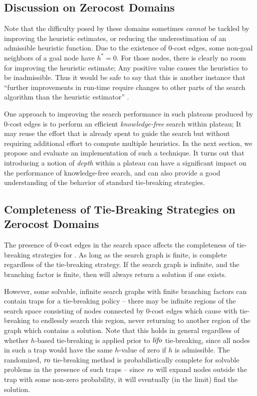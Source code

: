 \subsection{Discussion on Zerocost Domains}

Note that the difficulty posed by these domains sometimes \emph{cannot}
be tackled by improving the heuristic estimates, or reducing the
underestimation of an admissible heuristic function.  Due to the
existence of 0-cost edges, some non-goal neighbors of a goal node 
have $h^*=0$. For those nodes,
there is clearly no room for improving the heuristic estimate; Any positive
value causes the heuristics to be inadmissible.
Thus it would be safe to say that this is another instance that
``further improvements in run-time require
changes to other parts of the search algorithm than the heuristic estimator''
 \cite{helmert2008good}.

One approach to improving the search performance in such plateaus
produced by 0-cost edges is to perform an efficient
\emph{knowledge-free} search within plateau; It may reuse the effort
that is already spent to guide the search but without requiring 
additional effort to compute multiple heuristics.
In the next section, we propose and evaluate an implementation of
such a technique. It turns out that introducing a notion of \emph{depth} within a plateau can have
a significant impact on the performance of knowledge-free search, and can also 
provide a good  understanding of the behavior of standard tie-breaking strategies.

\subsection{Completeness of Tie-Breaking Strategies on Zerocost Domains}

The presence of 0-cost edges in the search space affects the completeness of tie-breaking strategies for \astar. 
As long as the search graph is finite, \astar is complete regardless of the tie-breaking strategy.
If the search graph is infinite, and the branching factor is finite, then 
\fifo will always return a solution if one exists.

However, some solvable, infinite search graphs with finite branching factors can contain traps for a \lifo tie-breaking policy -- there may be infinite regions of the search space consisting of nodes connected by 0-cost edges which cause \astar with \lifo tie-breaking to endlessly search this region, never returning to another region of the graph which contains a solution.
Note that this holds in general regardless of whether $h$-based tie-breaking is applied prior to ${\text{\textit{lifo}}}$ tie-breaking, since all nodes in such a trap would have the same $h$-value of zero if $h$ is admissible.
The randomized, ${\text{\textit{ro}}}$ tie-breaking method is probabilistically complete for solvable problems in the presence of such traps -- since ${\text{\textit{ro}}}$ will expand nodes outside the trap with some non-zero probability, it will eventually (in the limit) find the solution.

